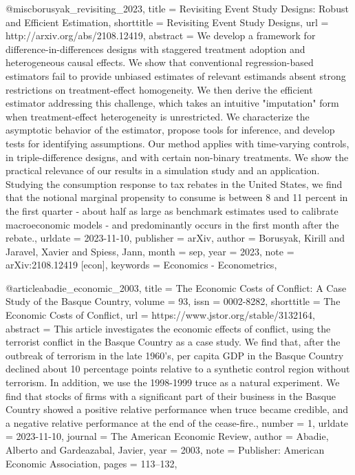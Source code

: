 @misc{borusyak_revisiting_2023,
	title = {Revisiting {Event} {Study} {Designs}: {Robust} and {Efficient} {Estimation}},
	shorttitle = {Revisiting {Event} {Study} {Designs}},
	url = {http://arxiv.org/abs/2108.12419},
	abstract = {We develop a framework for difference-in-differences designs with staggered treatment adoption and heterogeneous causal effects. We show that conventional regression-based estimators fail to provide unbiased estimates of relevant estimands absent strong restrictions on treatment-effect homogeneity. We then derive the efficient estimator addressing this challenge, which takes an intuitive "imputation" form when treatment-effect heterogeneity is unrestricted. We characterize the asymptotic behavior of the estimator, propose tools for inference, and develop tests for identifying assumptions. Our method applies with time-varying controls, in triple-difference designs, and with certain non-binary treatments. We show the practical relevance of our results in a simulation study and an application. Studying the consumption response to tax rebates in the United States, we find that the notional marginal propensity to consume is between 8 and 11 percent in the first quarter - about half as large as benchmark estimates used to calibrate macroeconomic models - and predominantly occurs in the first month after the rebate.},
	urldate = {2023-11-10},
	publisher = {arXiv},
	author = {Borusyak, Kirill and Jaravel, Xavier and Spiess, Jann},
	month = sep,
	year = {2023},
	note = {arXiv:2108.12419 [econ]},
	keywords = {Economics - Econometrics},
}

@article{abadie_economic_2003,
	title = {The {Economic} {Costs} of {Conflict}: {A} {Case} {Study} of the {Basque} {Country}},
	volume = {93},
	issn = {0002-8282},
	shorttitle = {The {Economic} {Costs} of {Conflict}},
	url = {https://www.jstor.org/stable/3132164},
	abstract = {This article investigates the economic effects of conflict, using the terrorist conflict in the Basque Country as a case study. We find that, after the outbreak of terrorism in the late 1960's, per capita GDP in the Basque Country declined about 10 percentage points relative to a synthetic control region without terrorism. In addition, we use the 1998-1999 truce as a natural experiment. We find that stocks of firms with a significant part of their business in the Basque Country showed a positive relative performance when truce became credible, and a negative relative performance at the end of the cease-fire.},
	number = {1},
	urldate = {2023-11-10},
	journal = {The American Economic Review},
	author = {Abadie, Alberto and Gardeazabal, Javier},
	year = {2003},
	note = {Publisher: American Economic Association},
	pages = {113--132},
}

